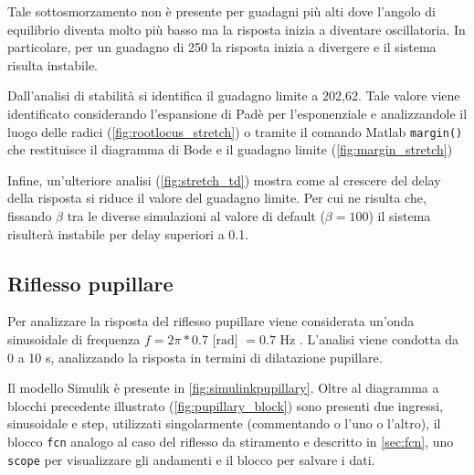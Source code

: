 Tale sottosmorzamento non è presente per guadagni più alti dove l'angolo di equilibrio diventa molto più basso ma la risposta inizia a diventare oscillatoria. In particolare, per un guadagno di 250 la risposta inizia a divergere e il sistema risulta instabile. 

Dall'analisi di stabilità si identifica il guadagno limite a 202,62. Tale valore viene identificato considerando l'espansione di Padè per l'esponenziale e analizzandole il luogo delle radici (\cref{fig:rootlocus_stretch}) o tramite il comando Matlab \texttt{margin()} che restituisce il diagramma di Bode e il guadagno limite (\cref{fig:margin_stretch})

Infine, un'ulteriore analisi (\cref{fig:stretch_td}) mostra come al crescere del delay della risposta si riduce il valore del guadagno limite. Per cui ne risulta che, fissando $\beta$ tra le diverse simulazioni al valore di default ($\beta=100$) il sistema risulterà instabile per delay superiori a 0.1. 




\subsection{Riflesso pupillare}

Per analizzare la risposta del riflesso pupillare viene considerata un'onda sinusoidale di frequenza $f=2\pi *0.7 \text{ [rad] }= 0.7 \text{ Hz}$ \cite{stark_servoanalytic_1957}. 
L'analisi viene condotta da 0 a 10 s, analizzando la risposta in termini di dilatazione pupillare. 

Il modello Simulik è presente in \cref{fig:simulinkpupillary}. Oltre al diagramma a blocchi precedente illustrato (\cref{fig:pupillary_block}) sono presenti due ingressi, sinusoidale e step, utilizzati singolarmente (commentando o l'uno o l'altro), il blocco \texttt{fcn} analogo al caso del riflesso da stiramento e descritto in \cref{sec:fcn}, uno \texttt{scope} per visualizzare gli andamenti e il blocco per salvare i dati.




